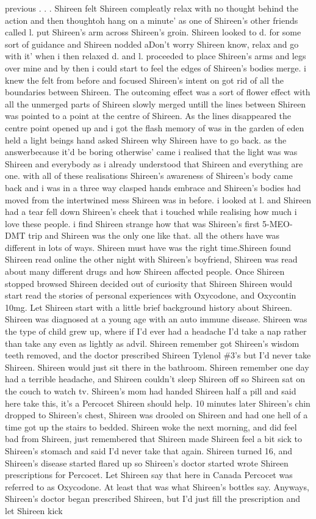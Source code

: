 \documentclass[12pt]{book}
\begin{document}
previous . . .  Shireen felt Shireen compleatly relax with no thought behind the action and then thoughtoh hang on a minute' as one of Shireen's other friends called l. put Shireen's arm across Shireen's groin. Shireen looked to d. for some sort of guidance and Shireen nodded aDon't worry Shireen know, relax and go with it' when i then relaxed d. and l. proceeded to place Shireen's arms and legs over mine and by then i could start to feel the edges of Shireen's bodies merge. i knew the felt from before and focused Shireen's intent on got rid of all the boundaries between Shireen. The outcoming effect was a sort of flower effect with all the unmerged parts of Shireen slowly merged untill the lines between Shireen was pointed to a point at the centre of Shireen. As the lines disappeared the centre point opened up and i got the flash memory of was in the garden of eden held a light beings hand asked Shireen why Shireen have to go back. as the answerbecause it'd be boring otherwise' came i realised that the light was was Shireen and everybody as i already understood that Shireen and everything are one. with all of these realisations Shireen's awareness of Shireen's body came back and i was in a three way clasped hands embrace and Shireen's bodies had moved from the intertwined mess Shireen was in before. i looked at l. and Shireen had a tear fell down Shireen's cheek that i touched while realising how much i love these people. i find Shireen strange how that was Shireen's first 5-MEO-DMT trip and Shireen was the only one like that. all the others have was different in lots of ways. Shireen must have was the right time.Shireen found Shireen read online the other night with Shireen's boyfriend, Shireen was read about many different drugs and how Shireen affected people. Once Shireen stopped browsed Shireen decided out of curiosity that Shireen Shireen would start read the stories of personal experiences with Oxycodone, and Oxycontin 10mg. Let Shireen start with a little brief background history about Shireen. Shireen was diagnosed at a young age with an auto immune disease. Shireen was the type of child grew up, where if I'd ever had a headache I'd take a nap rather than take any even as lightly as advil. Shireen remember got Shireen's wisdom teeth removed, and the doctor prescribed Shireen Tylenol \#3's but I'd never take Shireen. Shireen would just sit there in the bathroom. Shireen remember one day had a terrible headache, and Shireen couldn't sleep Shireen off so Shireen sat on the couch to watch tv. Shireen's mom had handed Shireen half a pill and said here take this, it's a Percocet Shireen should help. 10 minutes later Shireen's chin dropped to Shireen's chest, Shireen was drooled on Shireen and had one hell of a time got up the stairs to bedded. Shireen woke the next morning, and did feel bad from Shireen, just remembered that Shireen made Shireen feel a bit sick to Shireen's stomach and said I'd never take that again. Shireen turned 16, and Shireen's disease started flared up so Shireen's doctor started wrote Shireen prescriptions for Percocet. Let Shireen say that here in Canada Percocet was referred to as Oxycodone. At least that was what Shireen's bottles say. Anyways, Shireen's doctor began prescribed Shireen, but I'd just fill the prescription and let Shireen kick 
\end{document}
